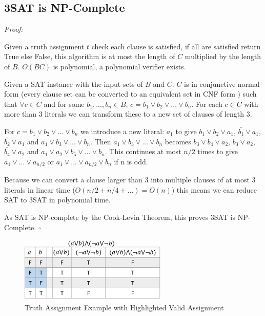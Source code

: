 \documentclass[a4paper,11pt]{report}
\begin{document}
\subsection{3SAT is NP-Complete}

\textit{Proof:}

Given a truth assignment $t$ check each clause is satisfied, if all are satisfied return True else False, this algorithm is at most the length of $C$ multiplied by the length of $B$. $O(BC)$ is polynomial, a polynomial verifier exists.

Given a SAT instance with the input sets of $B$ and $C$. $C$ is in conjunctive normal form (every clause set can be converted to an equivalent set in CNF form ) such that $\forall c \in C$ and for some $b_1, ... ,b_n \in B$, $c = b_1 \lor b_2
\lor ... \lor b_n$. For each $c \in C$ with more than 3 literals we can transform these to a new set of clauses of length 3.

For $c = b_1 \lor b_2 \lor ... \lor b_n$ we introduce a new literal: $a_1$ to give $b_1 \lor b_2 \lor a_1$, $\bar{b_1} \lor a_1$, $\bar{b_2} \lor a_1$ and $a_1 \lor b_3 \lor ... \lor b_n$. Then $a_1 \lor b_3 \lor ... \lor b_n$ becomes $b_3 \lor b_4 \lor a_2$, $\bar{b_3} \lor a_2$, $\bar{b_4} \lor a_2$ and $a_1 \lor a_2 \lor b_5 \lor ... \lor b_n$. This continues at most $n/2$ times to give $a_1 \lor ... \lor a_{n/2}$ or $a_1 \lor ... \lor a_{n/2} \lor b_n$ if n is odd.

Because we can convert a clause larger than 3 into multiple clauses of at most 3 literals in linear time ($O(n/2 + n/4 + ...) = O(n)$) this means we can reduce SAT to 3SAT in polynomial time.

As SAT is NP-complete by the Cook-Levin Theorem, this proves 3SAT is NP-Complete. $\square$
		
\begin{figure}
\begin{center}
		\includegraphics[width=70mm]{figures/sat_example.png}
\end{center}
		\caption{Truth Assignment Example with Highlighted Valid Assignment}
\end{figure}
\end{document}
